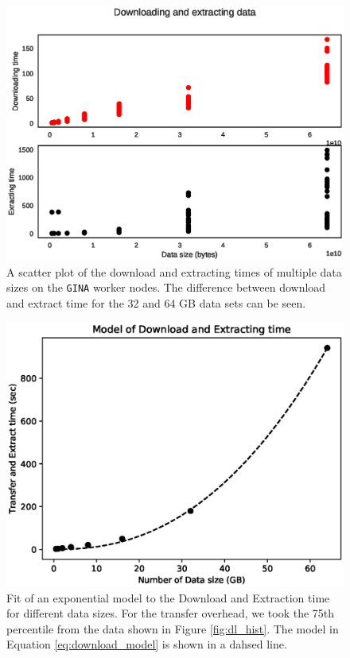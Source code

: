 \documentclass[preprint,5p]{elsarticle}
\begin{document}
\begin{figure}
    \includegraphics[width=0.95\linewidth]{figures/download_extract_sct.eps}
      \caption{A scatter plot of the download and extracting times of multiple data sizes on the \texttt{GINA} worker nodes. The difference between download and extract time for the 32 and 64 GB data sets can be seen.  }
	\label{fig:dl_plot}
\end{figure}

\begin{figure}
    \includegraphics[width=0.95\linewidth]{figures/Dl_Ex_model.eps}
      \caption{Fit of an exponential model to the Download and Extraction time for different data sizes. For the transfer overhead, we took the 75th percentile from the data shown in Figure \ref{fig:dl_hist}. The model in Equation \ref{eq:download_model} is shown in a dahsed line. }
	\label{fig:dl_ex_model}
\end{figure}
\end{document}
